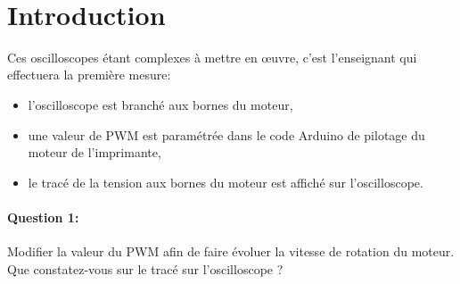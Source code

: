 

 \\

\graphicspath{{../../../img/}}
\begin{center}
\def\svgwidth{\columnwidth}

\end{center}

\section{Introduction}

Ces oscilloscopes étant complexes à mettre en \oe uvre, c'est l'enseignant qui effectuera la première mesure:
\begin{itemize}
 \item l'oscilloscope est branché aux bornes du moteur,
 \item une valeur de PWM est paramétrée dans le code Arduino de pilotage du moteur de l'imprimante,
 \item le tracé de la tension aux bornes du moteur est affiché sur l'oscilloscope.
\end{itemize}

\paragraph{Question 1:} Modifier la valeur du PWM afin de faire évoluer la vitesse de rotation du moteur. Que constatez-vous sur le tracé sur l'oscilloscope ?


